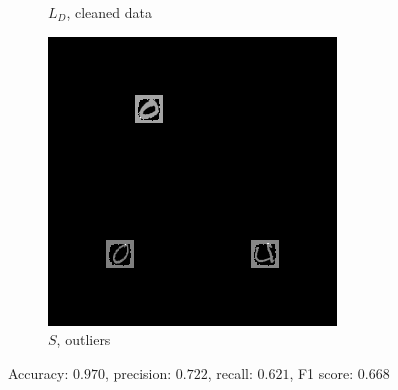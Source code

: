 \documentclass{beamer}
\theoremstyle{plain}
\theoremstyle{definition}
\theoremstyle{remark}
\begin{document}
\begin{frame}
\begin{figure}
\begin{subfigure}[b]{0.3\textwidth}
			\caption{$L_D$, cleaned data}
		\end{subfigure}
		\hfill
		\begin{subfigure}[b]{0.3\textwidth}
			\centering
			\includegraphics[width=\textwidth]{Images/l21S_5.468.png}
			\caption{$S$, outliers}
		\end{subfigure}
		   \caption{Accuracy: $0.970$, precision: $0.722$, recall: $0.621$, F1 score: $0.668$}
   \end{figure}
\end{frame}
\end{document}
